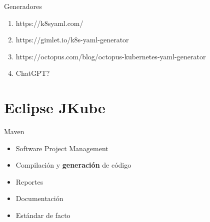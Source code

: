 \documentclass[aspectratio=169]{beamer}
\begin{document}
\begin{frame}{Generadores}
	
	\begin{enumerate}
		\item https://k8syaml.com/
		\item https://gimlet.io/k8s-yaml-generator
		\item https://octopus.com/blog/octopus-kubernetes-yaml-generator
		\item ChatGPT?
	\end{enumerate}
	
\end{frame}


{
	\section{Eclipse JKube}
}


\begin{frame}[fragile]{Maven}

           	\begin{itemize}
           		\item Software Project Management
           		\item Compilación y \textbf{generación} de código
           		\item Reportes
           		\item Documentación
                \item Estándar de facto
           	\end{itemize}

\end{frame}
\end{document}
